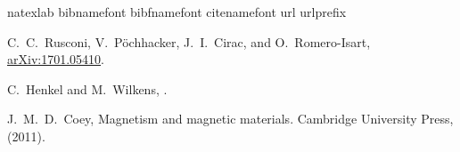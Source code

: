\documentclass[twocolumn,superscriptaddress,floatfix,preprintnumbers,prl]{revtex4}
\begin{document}
\begin{thebibliography}{27}

\expandafter\ifx\csname natexlab\endcsname\relax\def\natexlab#1{#1}\fi
\expandafter\ifx\csname bibnamefont\endcsname\relax
  \def\bibnamefont#1{#1}\fi
\expandafter\ifx\csname bibfnamefont\endcsname\relax
  \def\bibfnamefont#1{#1}\fi
\expandafter\ifx\csname citenamefont\endcsname\relax
  \def\citenamefont#1{#1}\fi
\expandafter\ifx\csname url\endcsname\relax
  \def\url#1{\texttt{#1}}\fi
\expandafter\ifx\csname urlprefix\endcsname\relax\def\urlprefix{URL }\fi
\providecommand{\bibinfo}[2]{#2}
\providecommand{\eprint}[2][]{\url{#2}}

C.~C.~Rusconi, V.~P\"ochhacker, J.~I.~Cirac, and O.~Romero-Isart, \href{https://arxiv.org/abs/1701.05410}{arXiv:1701.05410}.

C.~Henkel and M.~Wilkens, 
\href{http://epljournal.edpsciences.org/articles/epl/abs/1999/16/47402/47402.html}{}.

J.~M.~D.~Coey,  Magnetism and magnetic materials. Cambridge University Press, (2011).


\end{thebibliography}
\end{document}
